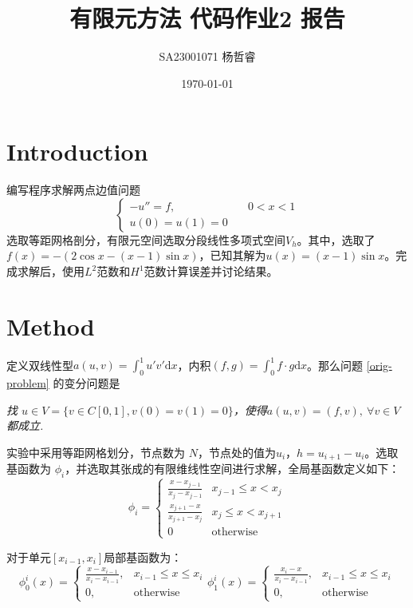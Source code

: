\documentclass{ctexart}
\title{有限元方法 代码作业2 报告}
\author{SA23001071 杨哲睿 }
\date{\today}
\begin{document}
\maketitle

\section{Introduction}

编写程序求解两点边值问题
\begin{equation}
\begin{cases} 
    -u'' = f, &\quad 0 < x < 1\\
    u(0) = u(1) = 0
\end{cases}\label{orig-problem}
\end{equation}
选取等距网格剖分，有限元空间选取分段线性多项式空间$V_h$。其中，选取了$f(x) = -(2 \cos x - (x - 1) \sin x)$，已知其解为$u(x) = (x-1) \sin x$。完成求解后，使用$L^2$范数和$H^1$范数计算误差并讨论结果。

\section{Method}

定义双线性型$a(u, v) = \int_0^1 u' v' \mathrm dx$，内积$(f, g) = \int_0 ^ 1 f \cdot g \mathrm dx$。那么问题 \eqref{orig-problem} 的变分问题是

\textit{找 $u\in V = \{ v\in C[0, 1], v(0) = v(1) = 0\}$，使得$a(u, v) = (f, v), ~ \forall v \in V$都成立.}

实验中采用等距网格划分，节点数为 $N$，节点处的值为$u_i$，$h = u_{i+1} - u_i$。选取基函数为 $\phi_i$，并选取其张成的有限维线性空间进行求解，全局基函数定义如下：
\begin{equation}
    \phi_i = \begin{cases}
        \frac{x - x_{j-1}}{x_j - x_{j-1}} & x_{j-1} \le x < x_j\\
        \frac{x_{j+1} - x}{x_{j+1} - x_{j}} & x_{j} \le x < x_{j+1}\\
        0 & \text{otherwise}
    \end{cases}
\end{equation}

对于单元$[x_{i-1}, x_i]$局部基函数为：
\begin{equation}
    \phi_0^i (x) =\begin{cases}
        \frac{x - x_{i-1}}{x_{i}- x_{i-1}}, & x_{i-1} \le x \le x_i\\
        0, & \text{otherwise}
    \end{cases}
    \phi_1^i (x) =\begin{cases}
        \frac{x_{i} - x}{x_{i}- x_{i-1}}, & x_{i-1} \le x \le x_i\\
        0, & \text{otherwise}
    \end{cases}
\end{equation}
\end{document}
